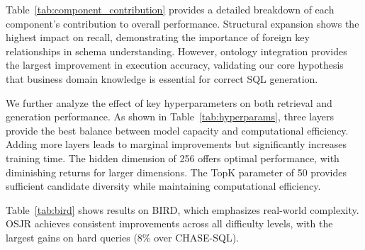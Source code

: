 \documentclass[sigconf, nonatbib]{acmart}
\begin{document}
Table~\ref{tab:component_contribution} provides a detailed breakdown of each component's contribution to overall performance. Structural expansion shows the highest impact on recall, demonstrating the importance of foreign key relationships in schema understanding. However, ontology integration provides the largest improvement in execution accuracy, validating our core hypothesis that business domain knowledge is essential for correct SQL generation.

We further analyze the effect of key hyperparameters on both retrieval and generation performance. As shown in Table~\ref{tab:hyperparams}, three layers provide the best balance between model capacity and computational efficiency. Adding more layers leads to marginal improvements but significantly increases training time. The hidden dimension of 256 offers optimal performance, with diminishing returns for larger dimensions. The TopK parameter of 50 provides sufficient candidate diversity while maintaining computational efficiency.

\begin{table}[t]
    \caption{Results on BIRD Benchmark}
    \label{tab:bird}
    \centering
\end{table}

Table~\ref{tab:bird} shows results on BIRD, which emphasizes real-world complexity. OSJR achieves consistent improvements across all difficulty levels, with the largest gains on hard queries (8\% over CHASE-SQL).

\begin{table}[t]
    \caption{Performance by Query Complexity on Spider}
    \label{tab:complexity}
    \centering
\end{table}
\end{document}
